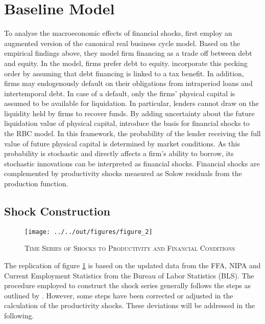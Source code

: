 \section{Baseline Model}
\label{sec:baseline_model}

To analyse the macroeconomic effects of financial shocks, \citeauthor{JERMANNfinancial} first employ an augmented version of the canonical real business cycle model. Based on the empirical findings above, they model firm financing as a trade off between debt and equity. In the model, firms prefer debt to equity. \citeauthor{JERMANNfinancial} incorporate this pecking order by assuming that debt financing is linked to a tax benefit. In addition, firms may endogenously default on their obligations from intraperiod loans and intertemporal debt. In case of a default, only the firms' physical capital is assumed to be available for liquidation. In particular, lenders cannot draw on the liquidity held by firms to recover funds. By adding uncertainty about the future liquidation value of physical capital, \citeauthor{JERMANNfinancial} introduce the basis for financial shocks to the RBC model. In this framework, the probability of the lender receiving the full value of future physical capital is determined by market conditions. As this probability is stochastic and directly affects a firm's ability to borrow, its stochastic innovations can be interpreted as financial shocks. Financial shocks are complemented by productivity shocks measured as Solow residuals from the production function.


\subsection{Shock Construction}
\label{sec:shock_construction}

\begin{figure}[t]
    \begin{center}
	    \texttt{[image: ../../out/figures/figure\_2]}
    	\caption{\textsc{Time Series of Shocks to Productivity and Financial Conditions}}
	    \label{fig:figure_2}
    \end{center}
\end{figure}

The replication of figure \ref{fig:figure_2} is based on the updated data from the FFA, NIPA and Current Employment Statistics from the Bureau of Labor Statistics (BLS). The procedure employed to construct the shock series generally follows the steps as outlined by \citeauthor{JERMANNfinancial}. However, some steps have been corrected or adjusted in the calculation of the productivity shocks. These deviations will be addressed in the following. 

